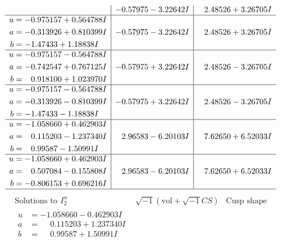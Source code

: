 \documentclass[1p]{elsarticle_modified}
\theoremstyle{definition}
\newcommand{\I}{\sqrt{-1}}
\begin{document}
$$\begin{array}{c|c|c}
 & -0.57975 - 3.22642 I & \phantom{-}2.48526 + 3.26705 I \\ \hline\begin{aligned}
u &= -0.975157 + 0.564788 I \\
a &= -0.313926 + 0.810399 I \\
b &= -1.47433 + 1.18838 I\end{aligned}
 & -0.57975 - 3.22642 I & \phantom{-}2.48526 + 3.26705 I \\ \hline\begin{aligned}
u &= -0.975157 - 0.564788 I \\
a &= -0.742547 + 0.767125 I \\
b &= \phantom{-}0.918100 + 1.023970 I\end{aligned}
 & -0.57975 + 3.22642 I & \phantom{-}2.48526 - 3.26705 I \\ \hline\begin{aligned}
u &= -0.975157 - 0.564788 I \\
a &= -0.313926 - 0.810399 I \\
b &= -1.47433 - 1.18838 I\end{aligned}
 & -0.57975 + 3.22642 I & \phantom{-}2.48526 - 3.26705 I \\ \hline\begin{aligned}
u &= -1.058660 + 0.462903 I \\
a &= \phantom{-}0.115203 - 1.237340 I \\
b &= \phantom{-}0.99587 - 1.50991 I\end{aligned}
 & \phantom{-}2.96583 - 6.20103 I & \phantom{-}7.62650 + 6.52033 I \\ \hline\begin{aligned}
u &= -1.058660 + 0.462903 I \\
a &= \phantom{-}0.507084 - 0.155808 I \\
b &= -0.806153 + 0.696216 I\end{aligned}
 & \phantom{-}2.96583 - 6.20103 I & \phantom{-}7.62650 + 6.52033 I\\
 \hline 
 \end{array}$$\newpage$$\begin{array}{c|c|c}  
\text{Solutions to }I^u_{2}& \I (\text{vol} + \sqrt{-1}CS) & \text{Cusp shape}\\
 \hline 
\begin{aligned}
u &= -1.058660 - 0.462903 I \\
a &= \phantom{-}0.115203 + 1.237340 I \\
b &= \phantom{-}0.99587 + 1.50991 I\end{aligned}

\end{array}$$
\end{document}
